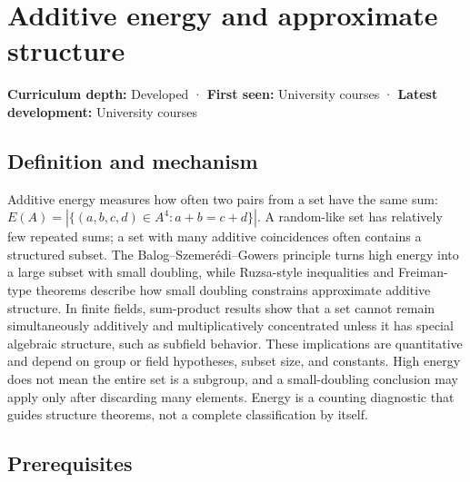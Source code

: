 \hypertarget{appendix-b0732b22e7d6}{}\label{referencestart:appendix-b0732b22e7d6}
\section{Additive energy and approximate structure}\label{appendix-b0732b22e7d6-additive-energy-and-approximate-structure}

\textbf{Curriculum depth:} Developed · \textbf{First seen:} University courses · \textbf{Latest development:} University courses

\begin{allmightroledefinition}

\subsection{Definition and mechanism}\label{appendix-b0732b22e7d6-definition-and-mechanism}

Additive energy measures how often two pairs from a set have the same sum: \(E(A)=|\{(a,b,c,d)\in A^4:a+b=c+d\}|\). A random-like set has relatively few repeated sums; a set with many additive coincidences often contains a structured subset. The Balog--Szemerédi--Gowers principle turns high energy into a large subset with small doubling, while Ruzsa-style inequalities and Freiman-type theorems describe how small doubling constrains approximate additive structure. In finite fields, sum-product results show that a set cannot remain simultaneously additively and multiplicatively concentrated unless it has special algebraic structure, such as subfield behavior. These implications are quantitative and depend on group or field hypotheses, subset size, and constants. High energy does not mean the entire set is a subgroup, and a small-doubling conclusion may apply only after discarding many elements. Energy is a counting diagnostic that guides structure theorems, not a complete classification by itself.

\end{allmightroledefinition}

\subsection{Prerequisites}\label{appendix-b0732b22e7d6-prerequisites}

